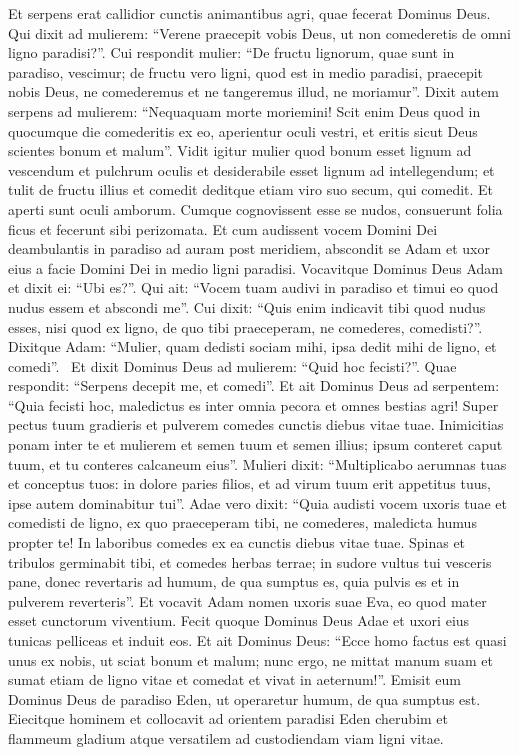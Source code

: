 \begin{biblechapter}  
\verse Et serpens erat callidior cunctis animantibus agri, quae fecerat Dominus Deus. Qui dixit ad mulierem: “Verene praecepit vobis Deus, ut non comederetis de omni ligno paradisi?”. 
\verse Cui respondit mulier: “De fructu lignorum, quae sunt in paradiso, vescimur; 
\verse de fructu vero ligni, quod est in medio paradisi, praecepit nobis Deus, ne comederemus et ne tangeremus illud, ne moriamur”. 
\verse Dixit autem serpens ad mulierem: “Nequaquam morte moriemini!  
\verse Scit enim Deus quod in quocumque die comederitis ex eo, aperientur oculi vestri, et eritis sicut Deus scientes bonum et malum”. 
\verse Vidit igitur mulier quod bonum esset lignum ad vescendum et pulchrum oculis et desiderabile esset lignum ad intellegendum; et tulit de fructu illius et comedit deditque etiam viro suo secum, qui comedit. 
\verse Et aperti sunt oculi amborum. Cumque cognovissent esse se nudos, consuerunt folia ficus et fecerunt sibi perizomata. 
\verse Et cum audissent vocem Domini Dei deambulantis in paradiso ad auram post meridiem, abscondit se Adam et uxor eius a facie Domini Dei in medio ligni paradisi. 
\verse Vocavitque Dominus Deus Adam et dixit ei: “Ubi es?”. 
\verse Qui ait: “Vocem tuam audivi in paradiso et timui eo quod nudus essem et abscondi me”. 
\verse Cui dixit: “Quis enim indicavit tibi quod nudus esses, nisi quod ex ligno, de quo tibi praeceperam, ne comederes, comedisti?”.  
\verse Dixitque Adam: “Mulier, quam dedisti sociam mihi, ipsa dedit mihi de ligno, et comedi”.  
\verse Et dixit Dominus Deus ad mulierem: “Quid hoc fecisti?”. Quae respondit: “Serpens decepit me, et comedi”. 
\verse Et ait Dominus Deus ad serpentem: “Quia fecisti hoc, maledictus es inter omnia pecora et omnes bestias agri! Super pectus tuum gradieris et pulverem comedes cunctis diebus vitae tuae. 
\verse Inimicitias ponam inter te et mulierem et semen tuum et semen illius; ipsum conteret caput tuum, et tu conteres calcaneum eius”. 
\verse Mulieri dixit: “Multiplicabo aerumnas tuas et conceptus tuos: in dolore paries filios, et ad virum tuum erit appetitus tuus, ipse autem dominabitur tui”. 
\verse Adae vero dixit: “Quia audisti vocem uxoris tuae et comedisti de ligno, ex quo praeceperam tibi, ne comederes, maledicta humus propter te! In laboribus comedes ex ea cunctis diebus vitae tuae. 
\verse Spinas et tribulos germinabit tibi, et comedes herbas terrae; 
\verse in sudore vultus tui vesceris pane, donec revertaris ad humum, de qua sumptus es, quia pulvis es et in pulverem reverteris”. 
\verse Et vocavit Adam nomen uxoris suae Eva, eo quod mater esset cunctorum viventium. 
\verse Fecit quoque Dominus Deus Adae et uxori eius tunicas pelliceas et induit eos. 
\verse Et ait Dominus Deus: “Ecce homo factus est quasi unus ex nobis, ut sciat bonum et malum; nunc ergo, ne mittat manum suam et sumat etiam de ligno vitae et comedat et vivat in aeternum!”.
\verse Emisit eum Dominus Deus de paradiso Eden, ut operaretur humum, de qua sumptus est. 
\verse Eiecitque hominem et collocavit ad orientem paradisi Eden cherubim et flammeum gladium atque versatilem ad custodiendam viam ligni vitae. 
\end{biblechapter}

